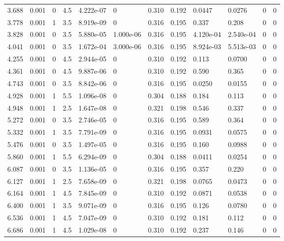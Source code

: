 \documentclass[preview]{standalone}
\begin{document}
{{\begin{tabular}{L{1.2cm}C{1.2cm} C{0.3cm}C{0.5cm} C{1.4cm}C{1.4cm} C{1.4cm}C{1.4cm} C{1.6cm}C{1.6cm} C{1.6cm}C{1.6cm}}
  3.688  &  0.001  & 0     & 4.5 &  4.222e-07  & 0  &  0.310&   0.192& 0.0447 & 0.0276   &  0 & 0  \\ 
  3.778  &  0.001  & 1     & 3.5 &  8.919e-09  & 0  &  0.316&   0.195& 0.337 & 0.208   &  0 & 0  \\ 
  3.828  &  0.001  & 0     & 3.5 &  5.880e-05  & 1.000e-06  &  0.316&   0.195& 4.120e-04 & 2.540e-04   &  0 & 0  \\ 
  4.041  &  0.001  & 0     & 3.5 &  1.672e-04  & 3.000e-06  &  0.316&   0.195& 8.924e-03 & 5.513e-03   &  0 & 0  \\ 
  4.255  &  0.001  & 0     & 4.5 &  2.944e-05  & 0  &  0.310&   0.192& 0.113 & 0.0700   &  0 & 0  \\ 
  4.361  &  0.001  & 0     & 4.5 &  9.887e-06  & 0  &  0.310&   0.192& 0.590 & 0.365   &  0 & 0  \\ 
  4.743  &  0.001  & 0     & 3.5 &  8.842e-06  & 0  &  0.316&   0.195& 0.0250 & 0.0155   &  0 & 0  \\ 
  4.928  &  0.001  & 1     & 5.5 &  1.096e-08  & 0  &  0.304&   0.188& 0.184 & 0.113   &  0 & 0  \\ 
  4.948  &  0.001  & 1     & 2.5 &  1.647e-08  & 0  &  0.321&   0.198& 0.546 & 0.337   &  0 & 0  \\ 
  5.272  &  0.001  & 0     & 3.5 &  2.746e-05  & 0  &  0.316&   0.195& 0.589 & 0.364   &  0 & 0  \\ 
  5.332  &  0.001  & 1     & 3.5 &  7.791e-09  & 0  &  0.316&   0.195& 0.0931 & 0.0575   &  0 & 0  \\ 
  5.476  &  0.001  & 0     & 3.5 &  1.497e-05  & 0  &  0.316&   0.195& 0.160 & 0.0988   &  0 & 0  \\ 
  5.860  &  0.001  & 1     & 5.5 &  6.294e-09  & 0  &  0.304&   0.188& 0.0411 & 0.0254   &  0 & 0  \\ 
  6.087  &  0.001  & 0     & 3.5 &  1.136e-05  & 0  &  0.316&   0.195& 0.357 & 0.220   &  0 & 0  \\ 
  6.127  &  0.001  & 1     & 2.5 &  7.658e-09  & 0  &  0.321&   0.198& 0.0765 & 0.0473   &  0 & 0  \\ 
  6.164  &  0.001  & 1     & 4.5 &  7.845e-09  & 0  &  0.310&   0.192& 0.0871 & 0.0538   &  0 & 0  \\ 
  6.400  &  0.001  & 1     & 3.5 &  9.071e-09  & 0  &  0.316&   0.195& 0.126 & 0.0780   &  0 & 0  \\ 
  6.536  &  0.001  & 1     & 4.5 &  7.047e-09  & 0  &  0.310&   0.192& 0.181 & 0.112   &  0 & 0  \\ 
  6.686  &  0.001  & 1     & 4.5 &  1.029e-08  & 0  &  0.310&   0.192& 0.237 & 0.146   &  0 & 0  \\ 

\end{tabular}}}
\end{document}
